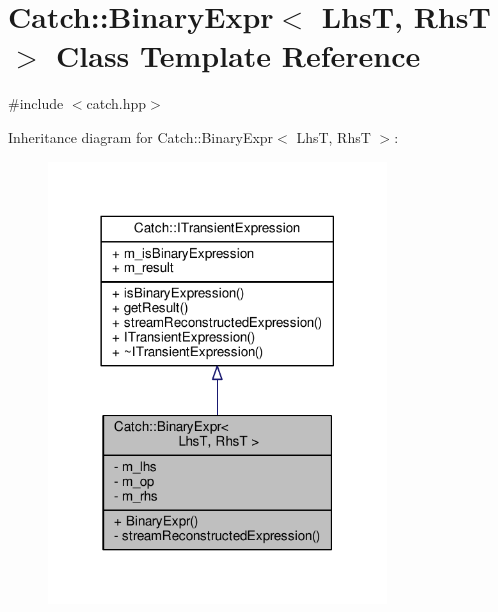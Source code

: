 \hypertarget{class_catch_1_1_binary_expr}{\section{Catch\-:\-:Binary\-Expr$<$ Lhs\-T, Rhs\-T $>$ Class Template Reference}
\label{class_catch_1_1_binary_expr}
}


{\ttfamily \#include $<$catch.\-hpp$>$}



Inheritance diagram for Catch\-:\-:Binary\-Expr$<$ Lhs\-T, Rhs\-T $>$\-:
\nopagebreak
\begin{figure}[H]
\begin{center}
\leavevmode
\includegraphics[width=254pt]{class_catch_1_1_binary_expr__inherit__graph}
\end{center}
\end{figure}


